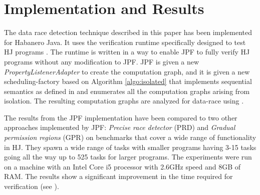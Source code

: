 \section{Implementation and Results}
\label{sec:res}

The data race detection technique described in this paper has been implemented for Habanero Java. It uses the verification runtime specifically designed to test HJ programs \cite{anderson2014jpf}. The runtime is written in a way to enable JPF to fully verify HJ programs without any modification to JPF.
JPF is given a new \textit{PropertyListenerAdapter} to create the computation graph, and it is given a new scheduling-factory based on Algorithm \ref{algo:isolated} that implements sequential semantics as defined in  and enumerates all the computation graphs arising from isolation. The resulting computation graphs are analyzed for data-race using . 

The results from the JPF implementation have been compared to two other approaches implemented by JPF: \textit{Precise race detector} (PRD) and \textit{Gradual permission regions} (GPR) on benchmarks that cover a wide range of functionality in HJ.  They spawn a wide range of tasks with smaller programs having 3-15 tasks going all the way up to 525 tasks for larger programs. The experiments were run on a machine with an Intel Core i5 processor with 2.6GHz speed and 8GB of RAM. The results show a significant improvement in the time required for verification (see ). 

